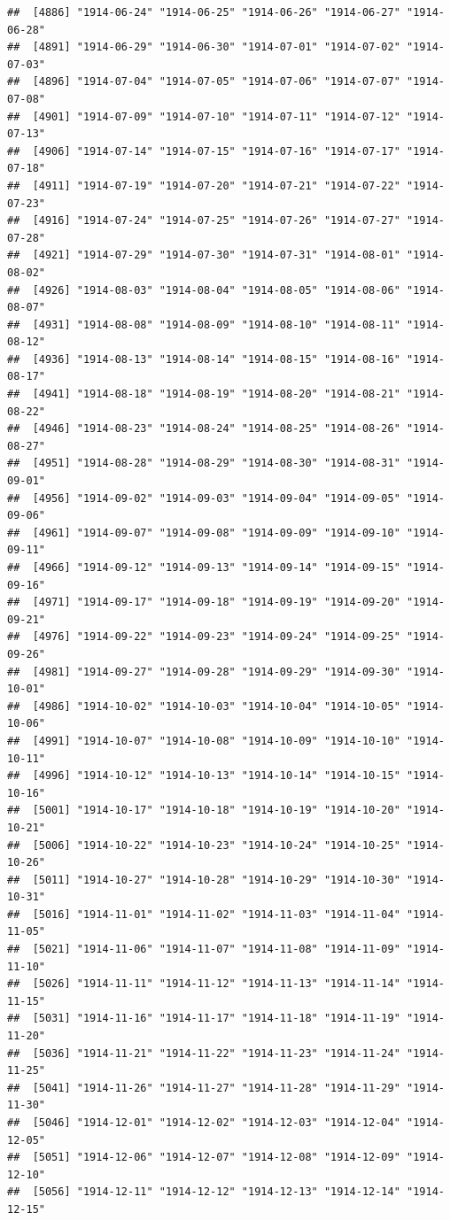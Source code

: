\documentclass{article}\usepackage[]{graphicx}\usepackage[]{color}
\makeatletter
\newenvironment{kframe}{%
 \def\at@end@of@kframe{}%
 \ifinner\ifhmode%
  \def\at@end@of@kframe{\end{minipage}}%
  \begin{minipage}{\columnwidth}%
 \fi\fi%
 \def\FrameCommand##1{\hskip\@totalleftmargin \hskip-\fboxsep
 \colorbox{shadecolor}{##1}\hskip-\fboxsep
     \hskip-\linewidth \hskip-\@totalleftmargin \hskip\columnwidth}%
 \MakeFramed {\advance\hsize-\width
   \@totalleftmargin\z@ \linewidth\hsize
   \@setminipage}}%
 {\par\unskip\endMakeFramed%
 \at@end@of@kframe}
\newenvironment{knitrout}{}{} %
\makeatother
\begin{document}
\begin{description}
\begin{knitrout}
\begin{kframe}
\begin{verbatim}
##  [4886] "1914-06-24" "1914-06-25" "1914-06-26" "1914-06-27" "1914-06-28"
##  [4891] "1914-06-29" "1914-06-30" "1914-07-01" "1914-07-02" "1914-07-03"
##  [4896] "1914-07-04" "1914-07-05" "1914-07-06" "1914-07-07" "1914-07-08"
##  [4901] "1914-07-09" "1914-07-10" "1914-07-11" "1914-07-12" "1914-07-13"
##  [4906] "1914-07-14" "1914-07-15" "1914-07-16" "1914-07-17" "1914-07-18"
##  [4911] "1914-07-19" "1914-07-20" "1914-07-21" "1914-07-22" "1914-07-23"
##  [4916] "1914-07-24" "1914-07-25" "1914-07-26" "1914-07-27" "1914-07-28"
##  [4921] "1914-07-29" "1914-07-30" "1914-07-31" "1914-08-01" "1914-08-02"
##  [4926] "1914-08-03" "1914-08-04" "1914-08-05" "1914-08-06" "1914-08-07"
##  [4931] "1914-08-08" "1914-08-09" "1914-08-10" "1914-08-11" "1914-08-12"
##  [4936] "1914-08-13" "1914-08-14" "1914-08-15" "1914-08-16" "1914-08-17"
##  [4941] "1914-08-18" "1914-08-19" "1914-08-20" "1914-08-21" "1914-08-22"
##  [4946] "1914-08-23" "1914-08-24" "1914-08-25" "1914-08-26" "1914-08-27"
##  [4951] "1914-08-28" "1914-08-29" "1914-08-30" "1914-08-31" "1914-09-01"
##  [4956] "1914-09-02" "1914-09-03" "1914-09-04" "1914-09-05" "1914-09-06"
##  [4961] "1914-09-07" "1914-09-08" "1914-09-09" "1914-09-10" "1914-09-11"
##  [4966] "1914-09-12" "1914-09-13" "1914-09-14" "1914-09-15" "1914-09-16"
##  [4971] "1914-09-17" "1914-09-18" "1914-09-19" "1914-09-20" "1914-09-21"
##  [4976] "1914-09-22" "1914-09-23" "1914-09-24" "1914-09-25" "1914-09-26"
##  [4981] "1914-09-27" "1914-09-28" "1914-09-29" "1914-09-30" "1914-10-01"
##  [4986] "1914-10-02" "1914-10-03" "1914-10-04" "1914-10-05" "1914-10-06"
##  [4991] "1914-10-07" "1914-10-08" "1914-10-09" "1914-10-10" "1914-10-11"
##  [4996] "1914-10-12" "1914-10-13" "1914-10-14" "1914-10-15" "1914-10-16"
##  [5001] "1914-10-17" "1914-10-18" "1914-10-19" "1914-10-20" "1914-10-21"
##  [5006] "1914-10-22" "1914-10-23" "1914-10-24" "1914-10-25" "1914-10-26"
##  [5011] "1914-10-27" "1914-10-28" "1914-10-29" "1914-10-30" "1914-10-31"
##  [5016] "1914-11-01" "1914-11-02" "1914-11-03" "1914-11-04" "1914-11-05"
##  [5021] "1914-11-06" "1914-11-07" "1914-11-08" "1914-11-09" "1914-11-10"
##  [5026] "1914-11-11" "1914-11-12" "1914-11-13" "1914-11-14" "1914-11-15"
##  [5031] "1914-11-16" "1914-11-17" "1914-11-18" "1914-11-19" "1914-11-20"
##  [5036] "1914-11-21" "1914-11-22" "1914-11-23" "1914-11-24" "1914-11-25"
##  [5041] "1914-11-26" "1914-11-27" "1914-11-28" "1914-11-29" "1914-11-30"
##  [5046] "1914-12-01" "1914-12-02" "1914-12-03" "1914-12-04" "1914-12-05"
##  [5051] "1914-12-06" "1914-12-07" "1914-12-08" "1914-12-09" "1914-12-10"
##  [5056] "1914-12-11" "1914-12-12" "1914-12-13" "1914-12-14" "1914-12-15"

\end{verbatim}
\end{kframe}
\end{knitrout}
\end{description}
\end{document}
